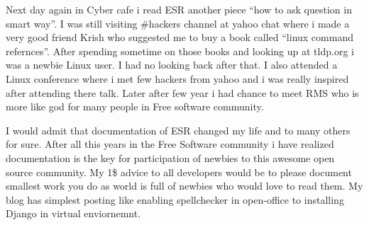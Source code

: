 Next day again in Cyber cafe i read ESR another piece “how to ask question in smart way”. I was still visiting \#hackers channel at yahoo chat where i made a very good friend Krish who suggested me to buy a book called “linux command refernces”.  After spending sometime on those books and looking up at tldp.org i was a newbie Linux user. I had no looking back after that. I also attended a Linux conference where i met few hackers from yahoo and i was really inspired after attending there talk. Later after few year i had chance to meet RMS who is more like god for many people in Free software community. 

I would admit that documentation of ESR changed my life and to many others for sure. After all this years in the Free Software community i have realized documentation is the key for participation of newbies to this awesome open source community. My 1\$ advice to all developers would be to please document smallest work you do as world is full of newbies who would love to read them. My blog has simplest posting like enabling spellchecker in open-office to installing Django in virtual enviornemnt.
